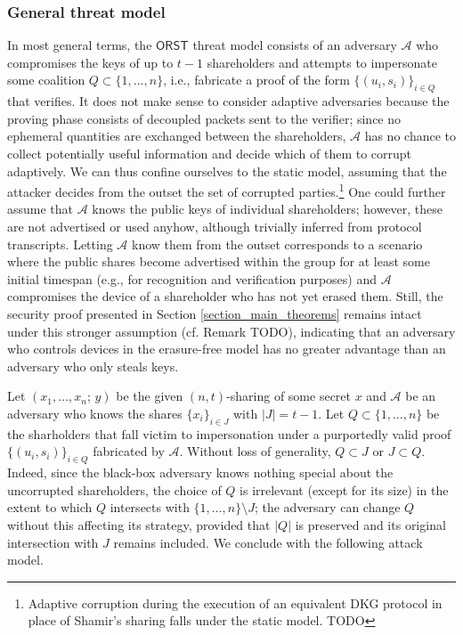 \documentclass[psamsfonts, reqno]{amsart}
\theoremstyle{definition}
\theoremstyle{remark}
\numberwithin{equation}{section}
\begin{document}
\subsubsection{General threat model}\label{section_general_threat_model}

In most general terms, the $\textsf{ORST}$ threat model
consists of an
adversary $\mathcal{A}$ who compromises the keys
of up to $t-1$ shareholders
and attempts to impersonate some coalition
$Q \subset \{1, \dots, n\}$,
i.e., fabricate a proof of the form
$\{(u_i, s_i)\}_{i \in Q}$ that verifies.
It does not make sense to consider adaptive adversaries
because the proving phase consists of decoupled
packets sent to the verifier;
since no ephemeral quantities are exchanged between the shareholders,
$\mathcal{A}$ has no chance to collect potentially
useful information and decide which of them
to corrupt adaptively.
We can thus confine ourselves to the static model,
assuming that the attacker decides from the outset the
set of corrupted parties.\footnote{Adaptive corruption
during the execution of an equivalent
DKG protocol in place of
Shamir's sharing falls under the static model. TODO}
One could further
assume that $\mathcal{A}$ knows
the public keys of individual shareholders;
however, these are not advertised or used anyhow,
although trivially inferred from protocol transcripts.
Letting $\mathcal{A}$ know them from the outset
corresponds to a scenario where the public shares
become advertised within the group
for at least some initial timespan
(e.g., for recognition and verification purposes)
and $\mathcal{A}$ compromises the device
of a shareholder who has not yet erased them.
Still, the security proof presented in
Section \ref{section_main_theorems}
remains intact under this stronger assumption
(cf. Remark TODO), indicating that
an adversary who controls devices
in the erasure-free model has no greater advantage than an
adversary who only steals keys.

Let $(x_1, \dots, x_n;\hspace{2pt} y)$
be the given $(n, t)$-sharing of some secret $x$
and $\mathcal{A}$ be an adversary who knows
the shares
$\{x_i\}_{i \in J}$ with $|J| = t-1$.
Let $Q \subset \{1, \dots, n\}$ be the
sharholders that fall victim to impersonation
under a purportedly valid proof $\{(u_i, s_i)\}_{i \in Q}$
fabricated by $\mathcal{A}$.
Without loss of generality,
$Q \subset J$ or $J \subset Q$.
Indeed, since the black-box adversary knows nothing
special about the uncorrupted shareholders,
the choice of $Q$ is irrelevant
(except for its size) in the extent to which
$Q$ intersects with $\{1, \dots, n\} \setminus J$;
the adversary can change $Q$
without this affecting its strategy,
provided that $|Q|$ is preserved and
its original intersection with $J$ remains included.
We conclude with the following attack model.
\end{document}
